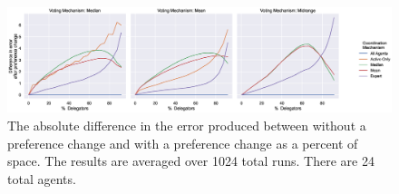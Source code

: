 \begin{landscape}
    \begin{figure}[p]
        \centering
        \includegraphics[scale=0.55]
        {content/chapter2/figures/abs_diff_from_preference_change_error_as_percent_of_space_abs_mean}
        \caption{
            The absolute difference in the error produced between without a
            preference change and with a preference change as a percent of space.
            The results are averaged over 1024 total runs.
            There are 24 total agents.
        }
        \label{fig:abs-diff-from-preference-change-error-as-percent-of-space-abs-mean}
    \end{figure}
\end{landscape}
